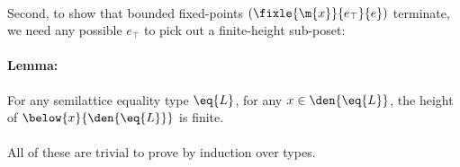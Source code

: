 \paragraph{}
Second, to show that bounded fixed-points $(\fixle{\m{x}}{e_\top}{e})$
terminate, we need any possible $e_\top$ to pick out a finite-height sub-poset:

\paragraph{Lemma:}
For any semilattice equality type $\eq{L}$, for any $x \in \den{\eq{L}}$, the
height of $\below{x}{\den{\eq{L}}}$ is finite.

\paragraph{}
All of these are trivial to prove by induction over types.


\newcommand{\fux}[2]{\Den{\vcenter{\infer{#1}{#2}}}}
\newcommand{\dg}{\;\delta\;\gamma}


